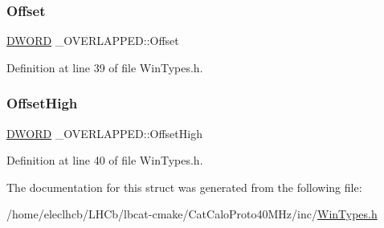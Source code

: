 \subsubsection{\texorpdfstring{Offset}{Offset}}
{\footnotesize\ttfamily \hyperlink{CatCaloProto40MHz_2inc_2WinTypes_8h_ad342ac907eb044443153a22f964bf0af}{D\+W\+O\+RD} \+\_\+\+O\+V\+E\+R\+L\+A\+P\+P\+E\+D\+::\+Offset}



Definition at line 39 of file Win\+Types.\+h.

\mbox{\label{struct__OVERLAPPED_a07370c1d35023959e51450a8e91c5a32}} 
\subsubsection{\texorpdfstring{Offset\+High}{OffsetHigh}}
{\footnotesize\ttfamily \hyperlink{CatCaloProto40MHz_2inc_2WinTypes_8h_ad342ac907eb044443153a22f964bf0af}{D\+W\+O\+RD} \+\_\+\+O\+V\+E\+R\+L\+A\+P\+P\+E\+D\+::\+Offset\+High}



Definition at line 40 of file Win\+Types.\+h.



The documentation for this struct was generated from the following file\+:\begin{DoxyCompactItemize}
\item 
/home/eleclhcb/\+L\+H\+Cb/lbcat-\/cmake/\+Cat\+Calo\+Proto40\+M\+Hz/inc/\hyperlink{CatCaloProto40MHz_2inc_2WinTypes_8h}{Win\+Types.\+h}\end{DoxyCompactItemize}
